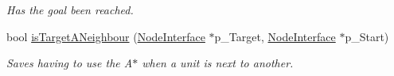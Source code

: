 \begin{DoxyCompactItemize}
\begin{DoxyCompactList}\small\item\em Has the goal been reached. \end{DoxyCompactList}\item 
\mbox{\label{class_graph_ab0941b61b65e6153f0bcf2a3f43f20b3}} 
bool \mbox{\hyperlink{class_graph_ab0941b61b65e6153f0bcf2a3f43f20b3}{is\+Target\+A\+Neighbour}} (\mbox{\hyperlink{class_node_interface}{Node\+Interface}} $\ast$p\+\_\+\+Target, \mbox{\hyperlink{class_node_interface}{Node\+Interface}} $\ast$p\+\_\+\+Start)
\begin{DoxyCompactList}\small\item\em Saves having to use the A$\ast$ when a unit is next to another. \end{DoxyCompactList}\end{DoxyCompactItemize}

